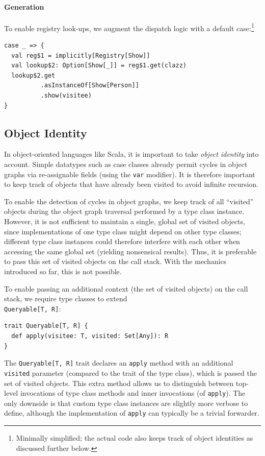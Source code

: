 \documentclass[preprint,nocopyrightspace]{sigplanconf}
\begin{document}
\paragraph{Generation}

To enable registry look-ups, we augment the dispatch logic with a default
case:\footnote{Minimally simplified; the actual code also keeps track of object
identities as discussed further below.}
\begin{lstlisting}
case _ => {
  val reg$1 = implicitly[Registry[Show]]
  val lookup$2: Option[Show[_]] = reg$1.get(clazz)
  lookup$2.get
          .asInstanceOf[Show[Person]]
          .show(visitee)
}
\end{lstlisting}


\subsection{Object Identity}\label{sec:oo-object-identity}

In object-oriented languages like Scala, it is important to take \emph{object
identity} into account. Simple datatypes such as case classes
already permit cycles in object graphs via re-assignable
fields (using the \verb|var| modifier). It is therefore important to keep
track of objects that have already been visited to avoid infinite recursion.

To enable the detection of cycles in object graphs, we keep track of all
``visited'' objects during the object graph traversal performed by a type
class instance. However, it is not sufficient to maintain a single, global set
of visited objects, since implementations of one type class might depend on
other type classes; different type class instances could therefore interfere
with each other when accessing the same global set (yielding nonsensical
results). Thus, it is preferable to pass this set of visited objects on the
call stack. With the mechanics introduced so far, this is not possible.

To enable passing an additional context (the set of visited objects) on the call stack,
we require type classes to extend \\\verb|Queryable[T, R]|:

\begin{lstlisting}
trait Queryable[T, R] {
  def apply(visitee: T, visited: Set[Any]): R
}
\end{lstlisting}
\noindent
The \verb|Queryable[T, R]| trait declares an \verb|apply| method with an
additional \verb|visited| parameter (compared to the trait of the type class),
which is passed the set of visited objects. This extra method allows us to
distinguish between top-level invocations of type class methods and inner
invocations (of \verb|apply|). The only downside is that custom type class
instances are slightly more verbose to define, although the implementation of
\verb|apply| can typically be a trivial forwarder.
\end{document}
